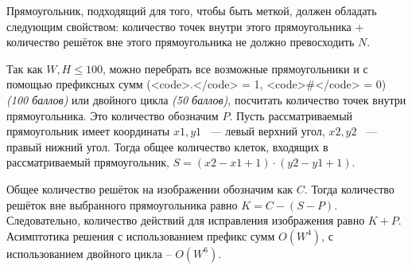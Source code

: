 \solutionSection

Прямоугольник, подходящий для того, чтобы быть меткой, должен обладать следующим свойством: количество точек внутри этого прямоугольника + количество решёток вне этого прямоугольника не должно превосходить $N$.

Так как $W, H \le 100$, можно перебрать все возможные прямоугольники и с помощью префиксных сумм (<code>.</code> = 1, <code>\#</code> = 0) \textit{(100 баллов)}  или двойного цикла \textit{(50 баллов)}, посчитать количество точек внутри прямоугольника. Это количество обозначим $P$. Пусть рассматриваемый прямоугольник имеет координаты $x1, y1$ ~--- левый верхний угол, $x2, y2$ ~--- правый нижний угол. Тогда общее количество клеток, входящих в рассматриваемый прямоугольник, \linebreak $S = (x2 - x1 + 1) \cdot (y2 - y1 + 1)$.

Общее количество решёток на изображении обозначим как $C$. Тогда количество решёток вне выбранного прямоугольника равно $K = C - (S - P)$. Следовательно, количество действий для исправления изображения равно $K + P$. Асимптотика решения с использованием префикс сумм $O(W^4)$, с использованием двойного цикла -- $O(W^6)$.

\codeExample

